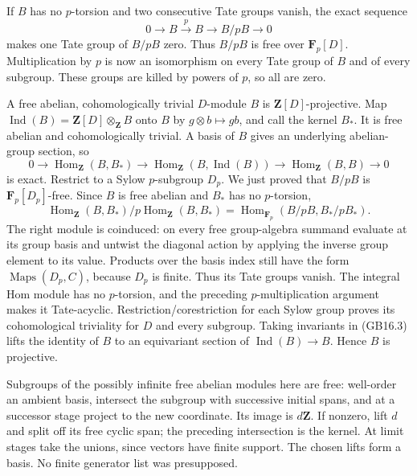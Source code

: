 \documentclass[
  11pt,
]{article}
\begin{document}
If \(B\) has no \(p\)-torsion and two consecutive Tate groups vanish,
the exact sequence \[
 0\longrightarrow B\xrightarrow{p}B\longrightarrow B/pB
                       \longrightarrow0
\] makes one Tate group of \(B/pB\) zero. Thus \(B/pB\) is free over
\(\mathbf F_p[D]\). Multiplication by \(p\) is now an isomorphism on
every Tate group of \(B\) and of every subgroup. These groups are killed
by powers of \(p\), so all are zero.

A free abelian, cohomologically trivial \(D\)-module \(B\) is
\(\mathbf Z[D]\)-projective. Map
\(\operatorname{Ind}(B)=\mathbf Z[D]\otimes_{\mathbf Z}B\) onto \(B\) by
\(g\otimes b\mapsto gb\), and call the kernel \(B_*\). It is free
abelian and cohomologically trivial. A basis of \(B\) gives an
underlying abelian-group section, so \[
 0\to\operatorname{Hom}_{\mathbf Z}(B,B_*)\to
 \operatorname{Hom}_{\mathbf Z}(B,\operatorname{Ind}(B))\to
 \operatorname{Hom}_{\mathbf Z}(B,B)\to0                       \tag{GB16.3}
\] is exact. Restrict to a Sylow \(p\)-subgroup \(D_p\). We just proved
that \(B/pB\) is \(\mathbf F_p[D_p]\)-free. Since \(B\) is free abelian
and \(B_*\) has no \(p\)-torsion, \[
 \operatorname{Hom}_{\mathbf Z}(B,B_*)/
       p\operatorname{Hom}_{\mathbf Z}(B,B_*)
 =\operatorname{Hom}_{\mathbf F_p}(B/pB,B_*/pB_*).
\] The right module is coinduced: on every free group-algebra summand
evaluate at its group basis and untwist the diagonal action by applying
the inverse group element to its value. Products over the basis index
still have the form \(\operatorname{Maps}(D_p,C)\), because \(D_p\) is
finite. Thus its Tate groups vanish. The integral Hom module has no
\(p\)-torsion, and the preceding \(p\)-multiplication argument makes it
Tate-acyclic. Restriction/corestriction for each Sylow group proves its
cohomological triviality for \(D\) and every subgroup. Taking invariants
in (GB16.3) lifts the identity of \(B\) to an equivariant section of
\(\operatorname{Ind}(B)\to B\). Hence \(B\) is projective.

Subgroups of the possibly infinite free abelian modules here are free:
well-order an ambient basis, intersect the subgroup with successive
initial spans, and at a successor stage project to the new coordinate.
Its image is \(d\mathbf Z\). If nonzero, lift \(d\) and split off its
free cyclic span; the preceding intersection is the kernel. At limit
stages take the unions, since vectors have finite support. The chosen
lifts form a basis. No finite generator list was presupposed.
\end{document}
